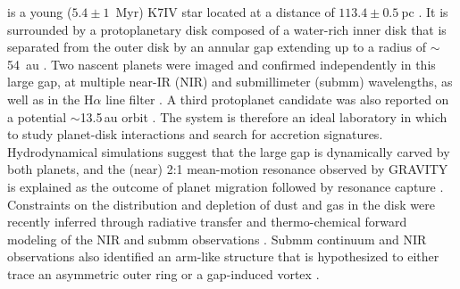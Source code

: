 \documentclass[longauth]{aa}
\newcommand{\vc}[1]{#1}
\begin{document}
     is a young ($5.4\pm1$~Myr) K7IV star located at a distance of $113.4\pm0.5~$pc \citep{Muller2018,Gaia-Collaboration2021}. It is surrounded by a protoplanetary disk composed of a %
    water-rich inner disk \citep{%
    Dong2012, Perotti2023} that is separated from the outer disk by an annular gap extending up to a radius of 
    $\sim$54~au \citep{Long2018,Keppler2019}. %
   Two nascent planets were imaged and confirmed independently in this large %
   gap, at multiple near-IR (NIR) and submillimeter (submm) wavelengths, as well as in the H$\alpha$ line filter \citep[e.g.,][]{Keppler2018,Muller2018,Christiaens2019, Haffert2019, Isella2019, Benisty2021}. %
   A third protoplanet candidate was also reported %
   on a potential $\sim$13.5\,au orbit %
   \citep[][hereafter ]{Mesa2019a}.
   The system is therefore an ideal laboratory in which to study planet-disk interactions and search for accretion signatures. Hydrodynamical simulations suggest that the large gap is dynamically carved by both planets, and the (near) 2:1 mean-motion resonance observed by \vc{GRAVITY} \citep{Wang2021} %
   is explained as the outcome of planet migration followed by resonance capture \citep{Bae2019, Toci2020}. %
   Constraints on the distribution and depletion %
   of dust and gas in the disk were recently inferred through radiative transfer and thermo-chemical \vc{forward modeling} of the NIR and submm  observations \citep{Portilla-Revelo2022,Portilla-Revelo2023}. 
   Submm continuum and NIR observations also 
   identified an arm-like structure that is hypothesized to either trace an asymmetric outer ring or a gap-induced 
   vortex \citep[][]{Isella2019, %
   Juillard2022}. %
    
\end{document}
